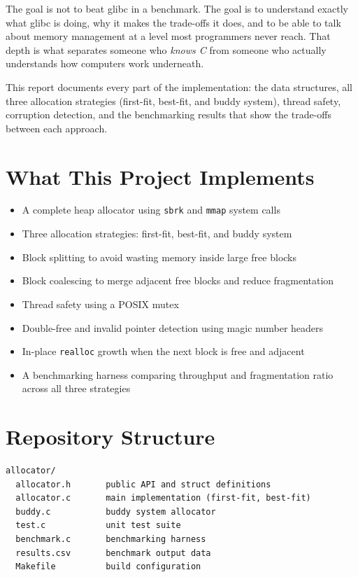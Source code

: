 \documentclass[12pt, a4paper]{report}
\begin{document}
The goal is not to beat glibc in a benchmark. The goal is to understand exactly
what glibc is doing, why it makes the trade-offs it does, and to be able to talk
about memory management at a level most programmers never reach. That depth is
what separates someone who \textit{knows C} from someone who actually understands
how computers work underneath.

This report documents every part of the implementation: the data structures, all
three allocation strategies (first-fit, best-fit, and buddy system), thread
safety, corruption detection, and the benchmarking results that show the
trade-offs between each approach.

\section{What This Project Implements}

\begin{itemize}
  \item A complete heap allocator using \texttt{sbrk} and \texttt{mmap} system calls
  \item Three allocation strategies: first-fit, best-fit, and buddy system
  \item Block splitting to avoid wasting memory inside large free blocks
  \item Block coalescing to merge adjacent free blocks and reduce fragmentation
  \item Thread safety using a POSIX mutex
  \item Double-free and invalid pointer detection using magic number headers
  \item In-place \texttt{realloc} growth when the next block is free and adjacent
  \item A benchmarking harness comparing throughput and fragmentation ratio across all three strategies
\end{itemize}

\section{Repository Structure}

\begin{lstlisting}[style=shellstyle, numbers=none]
allocator/
  allocator.h       public API and struct definitions
  allocator.c       main implementation (first-fit, best-fit)
  buddy.c           buddy system allocator
  test.c            unit test suite
  benchmark.c       benchmarking harness
  results.csv       benchmark output data
  Makefile          build configuration
\end{lstlisting}
\end{document}
